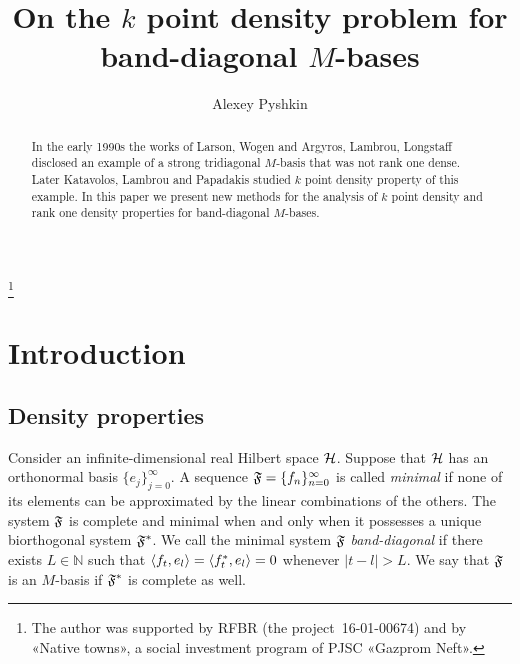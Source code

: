 \documentclass[12pt]{amsart}
\theoremstyle{case}
\begin{document}
\title{On the $k$ point density problem for band-diagonal $M$-bases}
\author{Alexey Pyshkin}
\begin{abstract}
  In the early 1990s the works of Larson, Wogen and Argyros, Lambrou, Longstaff
    disclosed an example of a strong tridiagonal $M$-basis that was not rank one dense.
  Later Katavolos, Lambrou and Papadakis studied $k$ point density property of this example.
  In this paper we present new methods for the analysis of $k$ point density
    and rank one density properties for band-diagonal $M$-bases.
\end{abstract}
\thanks{The author was supported by RFBR (the project~16-01-00674) and by «Native towns», a social investment program of PJSC «Gazprom Neft».}
\maketitle

\section{Introduction}
  \subsection{Density properties}
    Consider an infinite-dimensional real Hilbert space $\cal{H}$.
    Suppose that $\cal{H}$ has an orthonormal basis $\{e_j\}_{j=0}^\infty$.
    A sequence $\fsys=\seq{f}$ is called \emph{minimal} if none of its elements can be approximated by the linear combinations of the others.
    The system $\fsys$ is complete and minimal when and only when it possesses a unique biorthogonal system $\fstarsys$.
    We call the minimal system $\fsys$ \emph{band-diagonal} if there exists $L \in \mathbb{N}$ such that $\inner{f_t}{e_l} = \inner{f^*_t}{e_l} = 0$
      whenever $\lvert t - l \rvert > L$.
    We say that $\fsys$ is an $M$-basis if $\fstarsys$ is complete as well.
    
\end{document}

